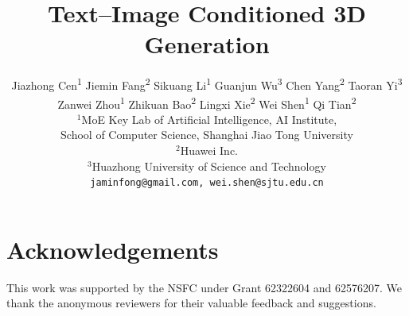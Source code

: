 \documentclass[10pt,twocolumn,letterpaper]{article}
\title{Text–Image Conditioned 3D Generation}
\author{
Jiazhong Cen\textsuperscript{\rm 1}\footnotemark[2] \quad
Jiemin Fang\textsuperscript{\rm 2 \Letter} \quad
Sikuang Li\textsuperscript{\rm 1}\footnotemark[2] \quad
Guanjun Wu\textsuperscript{\rm 3}\footnotemark[2] \quad
Chen Yang\textsuperscript{\rm 2} \quad
Taoran Yi\textsuperscript{\rm 3}\footnotemark[2] \\
Zanwei Zhou\textsuperscript{\rm 1}\footnotemark[2] \quad
Zhikuan Bao\textsuperscript{\rm 2} \quad
Lingxi Xie\textsuperscript{\rm 2} \quad
Wei Shen\textsuperscript{\rm 1 \Letter} \quad
Qi Tian\textsuperscript{\rm 2} \\
$^{1}$MoE Key Lab of Artificial Intelligence, AI Institute, \\
School of Computer Science, Shanghai Jiao Tong University \\
$^{2}$Huawei Inc. \\
$^{3}$Huazhong University of Science and Technology \\
{\tt\small jaminfong@gmail.com, wei.shen@sjtu.edu.cn}
}
\begin{document}
\maketitle

{
\renewcommand{\thefootnote}{\fnsymbol{footnote}}
}








\section*{Acknowledgements}
This work was supported by the NSFC under Grant 62322604 and 62576207. We thank the anonymous reviewers for their valuable feedback and suggestions.
{
    \small
    
    
}


%      
%      
\end{document}
